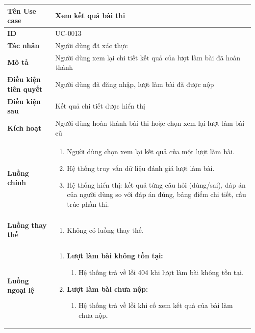 {
\small
\renewcommand{\arraystretch}{1.15}

\begin{tabularx}{\textwidth}{|>{\raggedright\arraybackslash}p{3.5cm}|>{\raggedright\arraybackslash}X|}
\hline
\textbf{Tên Use case} & Xem kết quả bài thi \\
\hline
\textbf{ID} & UC-0013 \\
\hline
\textbf{Tác nhân} & Người dùng đã xác thực \\
\hline
\textbf{Mô tả} & Người dùng xem lại chi tiết kết quả của lượt làm bài đã hoàn thành \\
\hline
\textbf{Điều kiện tiên quyết} & Người dùng đã đăng nhập, lượt làm bài đã được nộp \\
\hline
\textbf{Điều kiện sau} & Kết quả chi tiết được hiển thị \\
\hline
\textbf{Kích hoạt} & Người dùng hoàn thành bài thi hoặc chọn xem lại lượt làm bài cũ \\
\hline
\textbf{Luồng chính} &
\begin{enumerate}
    \item Người dùng chọn xem lại kết quả của một lượt làm bài.
    \item Hệ thống truy vấn dữ liệu đánh giá lượt làm bài.
    \item Hệ thống hiển thị: kết quả từng câu hỏi (đúng/sai), đáp án của người dùng so với đáp án đúng, bảng điểm chi tiết, cấu trúc phần thi.
\end{enumerate} \\
\hline
\textbf{Luồng thay thế} &
\begin{enumerate}
    \item Không có luồng thay thế.
\end{enumerate} \\
\hline
\textbf{Luồng ngoại lệ} &
\begin{enumerate}
    \item \textbf{Lượt làm bài không tồn tại:}
    \begin{enumerate}
        \item[2Err.] Hệ thống trả về lỗi 404 khi lượt làm bài không tồn tại.
    \end{enumerate}
    \item \textbf{Lượt làm bài chưa nộp:}
    \begin{enumerate}
        \item[2Err2.] Hệ thống trả về lỗi khi cố xem kết quả của bài làm chưa nộp.
    \end{enumerate}
\end{enumerate} \\
\hline
\end{tabularx}
}
